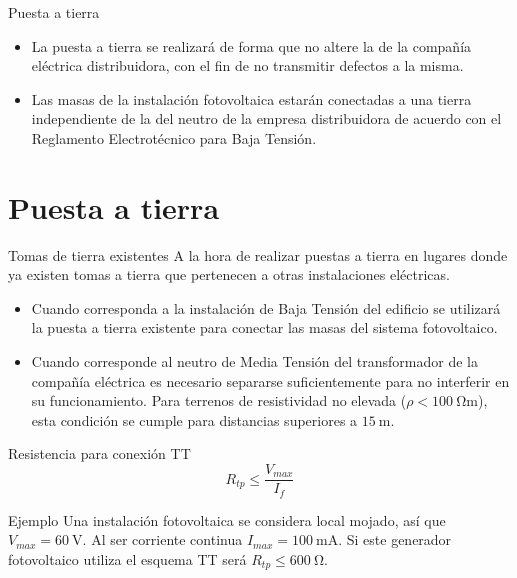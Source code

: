 \documentclass[xcolor={usenames,svgnames,dvipsnames}]{beamer}
\begin{document}
\begin{frame}[label={sec:orgc1514d5}]{Puesta a tierra}
\begin{itemize}
\item \alert{La puesta a tierra} se realizará de forma que \alert{no altere la de la
compañía eléctrica distribuidora}, con el fin de no transmitir
defectos a la misma.

\item \alert{Las masas de la instalación fotovoltaica estarán conectadas a una
tierra independiente de la del neutro} de la empresa distribuidora
de acuerdo con el Reglamento Electrotécnico para Baja Tensión.
\end{itemize}
\end{frame}


\section{Puesta a tierra}
\label{sec:orge7b97a3}

\begin{frame}[label={sec:orgd740fad}]{Tomas de tierra existentes}
A la hora de realizar puestas a tierra en lugares donde ya existen
tomas a tierra que pertenecen a otras instalaciones eléctricas.

\begin{itemize}
\item Cuando corresponda a la \alert{instalación de Baja Tensión del edificio}
\alert{se utilizará la puesta a tierra existente} para conectar las masas
del sistema fotovoltaico.

\item Cuando corresponde al \alert{neutro de Media Tensión del transformador de
la compañía eléctrica} es necesario \alert{separarse suficientemente} para
no interferir en su funcionamiento. Para terrenos de resistividad no
elevada (\(\rho<\SI{100}{\ohm\meter}\)), esta condición se cumple para
distancias superiores a \(\SI{15}{\meter}\).
\end{itemize}
\end{frame}


\begin{frame}[label={sec:orgf3e84df}]{Resistencia para conexión TT}
$$R_{tp}\leq\frac{V_{max}}{I_{f}}$$

\begin{block}{Ejemplo}
Una instalación fotovoltaica se considera local mojado,
así que \(V_{max}=\SI{60}{\volt}\). Al ser corriente continua
\(I_{max}=\SI{100}{\milli\ampere}\). Si este generador fotovoltaico
utiliza el esquema TT será \(R_{tp}\leq\SI{600}{\ohm}\).
\end{block}
\end{frame}
\end{document}
